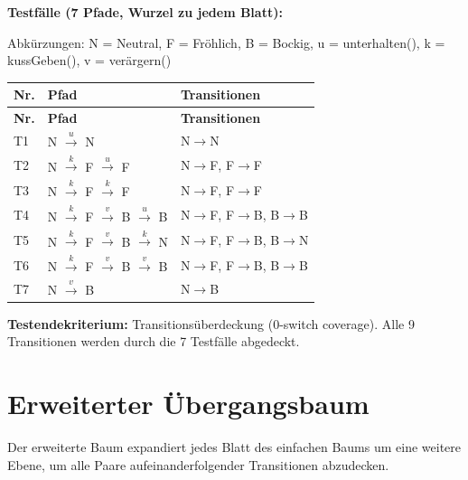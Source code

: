 \documentclass[
	fontsize=12pt,          %
	paper=a4,               %
	numbers=noenddot,       %
	listof=totoc,           %
	listof=entryprefix,     %
	listof=nochaptergap,    %
	bibliography=totoc,     %
	parskip=half,           %
	openany                 %
]{scrbook}
\begin{document}
\textbf{Testfälle (7 Pfade, Wurzel zu jedem Blatt):}

Abkürzungen: N = Neutral, F = Fröhlich, B = Bockig, u = unterhalten(), k = kussGeben(), v = verärgern()

\begin{longtable}{| p{0.5cm} | p{8.5cm} | p{3.0cm} |}
	\hline
	\textbf{Nr.} & \textbf{Pfad} & \textbf{Transitionen} \\ \hline
	\endfirsthead
	\hline
	\textbf{Nr.} & \textbf{Pfad} & \textbf{Transitionen} \\ \hline
	\endhead
	\hline
	\endfoot
	T1 & N $\xrightarrow{u}$ N & N$\rightarrow$N \\ \hline
	T2 & N $\xrightarrow{k}$ F $\xrightarrow{u}$ F & N$\rightarrow$F, F$\rightarrow$F \\ \hline
	T3 & N $\xrightarrow{k}$ F $\xrightarrow{k}$ F & N$\rightarrow$F, F$\rightarrow$F \\ \hline
	T4 & N $\xrightarrow{k}$ F $\xrightarrow{v}$ B $\xrightarrow{u}$ B & N$\rightarrow$F, F$\rightarrow$B, B$\rightarrow$B \\ \hline
	T5 & N $\xrightarrow{k}$ F $\xrightarrow{v}$ B $\xrightarrow{k}$ N & N$\rightarrow$F, F$\rightarrow$B, B$\rightarrow$N \\ \hline
	T6 & N $\xrightarrow{k}$ F $\xrightarrow{v}$ B $\xrightarrow{v}$ B & N$\rightarrow$F, F$\rightarrow$B, B$\rightarrow$B \\ \hline
	T7 & N $\xrightarrow{v}$ B & N$\rightarrow$B \\ \hline
\end{longtable}

\textbf{Testendekriterium:} Transitionsüberdeckung (0-switch coverage).
Alle 9 Transitionen werden durch die 7 Testfälle abgedeckt.

\section*{Erweiterter Übergangsbaum}

Der erweiterte Baum expandiert jedes Blatt des einfachen Baums um eine weitere Ebene, um alle Paare aufeinanderfolgender Transitionen abzudecken.
\end{document}

